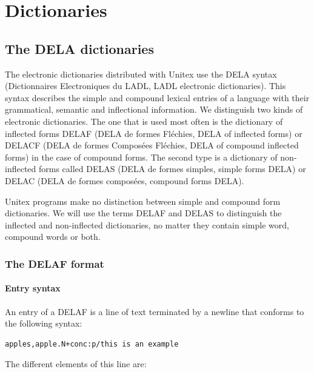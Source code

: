\chapter{Dictionaries}
\label{chap-dictionaries}

\section{The DELA dictionaries}

The electronic dictionaries distributed with Unitex use the DELA syntax
(Dictionnaires Electroniques du LADL, LADL electronic dictionaries). This syntax
describes the simple and compound lexical entries  of a
language with their grammatical, semantic and inflectional information. We
distinguish two kinds of electronic dictionaries. The one that is used most often
is the  dictionary of inflected forms DELAF (DELA de formes Fl\'echies, DELA of
inflected forms) or DELACF (DELA de formes Compos\'ees Fl\'echies, DELA of
compound inflected forms) in the case of compound forms.
The second type is a dictionary of non-inflected forms called DELAS (DELA de
formes simples, simple forms DELA) or DELAC (DELA de formes compos\'ees,
compound forms DELA).

\bigskip
\noindent Unitex programs make no  distinction between simple and compound form
dictionaries. We will use the terms DELAF and DELAS to distinguish the
inflected and non-inflected dictionaries, no matter they contain simple word,
compound words or both.

\subsection{The DELAF format}
\label{section-DELAF-format}
\subsubsection{Entry syntax}
An entry of a DELAF is a line of text terminated by a newline that conforms to
the following syntax:

\bigskip
\begin{verbatim}
apples,apple.N+conc:p/this is an example
\end{verbatim}

\bigskip
\noindent The different elements of this line are:


